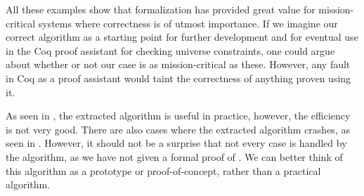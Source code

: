 All these examples show that formalization has provided great value for mission-critical
systems where correctness is of utmost importance.
If we imagine our correct algorithm as a starting point for further development
and for eventual use in the Coq proof assistant for checking universe constraints,
one could argue about whether or not our case is as mission-critical as these.
However, any fault in Coq as a proof assistant would taint the correctness of anything proven using it.

As seen in , the extracted algorithm is useful in practice,
however, the efficiency is not very good.
There are also cases where the extracted algorithm crashes, as seen in .
However, it should not be a surprise that not every case is handled by the algorithm,
as we have not given a formal proof of .
We can better think of this algorithm as a prototype or proof-of-concept,
rather than a practical algorithm.
